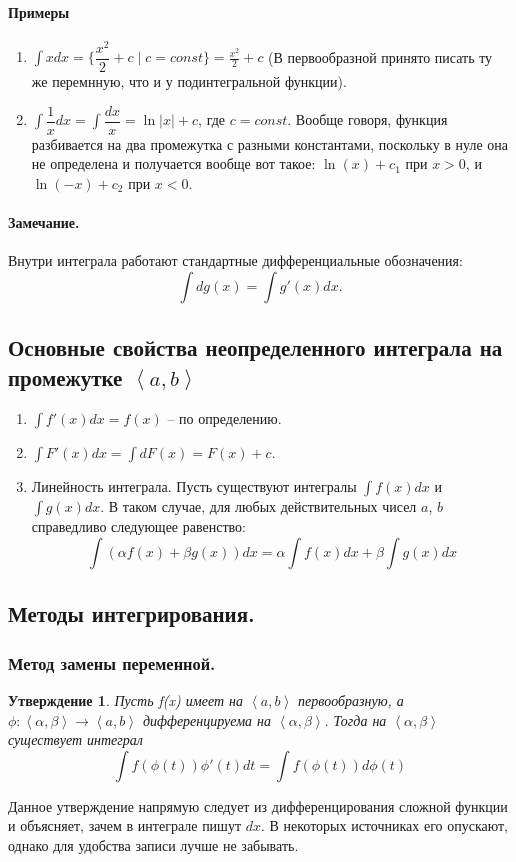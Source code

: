 \documentclass{article}
\theoremstyle{plain}
\newtheorem{claim}{Утверждение}
\theoremstyle{definition}
\theoremstyle{remark}
\begin{document}
\paragraph{Примеры}
\begin{enumerate}
\item $\displaystyle \int xdx = \Big\{\dfrac{x^2}{2} + c \;| \;c = const\Big\} = \frac{x^2}{2} + c$ (В первообразной принято писать ту же перемнную, что и у подинтегральной функции).
\item $\displaystyle \int \dfrac{1}{x}dx = \int\dfrac{dx}{x} = \ln|x| + c$, где $c=const$. Вообще говоря, функция разбивается на два промежутка с разными константами, поскольку в нуле она не определена и получается вообще вот такое: $\ln(x) + c_1$ при $x > 0$, и $\ln(-x) + c_2$ при $x < 0$.
\end{enumerate}
\paragraph{Замечание.} Внутри интеграла работают стандартные дифференциальные обозначения: \[\int dg(x) = \int g'(x)dx.\]
\subsection{Основные свойства неопределенного интеграла на промежутке $\left<a, b\right>$}
\begin{enumerate}

\item$\int f'(x)dx = f(x)$ -- по определению.\\
\item $\int F'(x)dx = \int dF(x) = F(x) + c.$\\
\item {Линейность интеграла.} Пусть существуют интегралы $\int f(x)dx$ и $\int g(x)dx$. В таком случае, для любых действительных чисел $a$, $b$ справедливо следующее равенство: \[ \int (\alpha f(x) + \beta g(x))dx = \alpha \int f(x)dx + \beta \int g(x)dx\]
\end{enumerate}
\subsection{Методы интегрирования.}
\subsubsection*{Метод замены переменной.}
\begin{claim}
Пусть f(x) имеет на $\left<a, b\right>$ первообразную, а $\phi : \left<\alpha, \beta\right> \rightarrow \left<a, b\right>$ дифференцируема на $\left<\alpha, \beta\right>.$ Тогда на $\left<\alpha, \beta\right>$ существует интеграл \[\int f(\phi(t))\phi'(t)dt = \int f(\phi(t))d\phi(t)\] 
\end{claim}
Данное утверждение напрямую следует из дифференцирования сложной функции и объясняет, зачем в интеграле пишут $dx$. В некоторых источниках его опускают, однако для удобства записи лучше не забывать.
\end{document}
